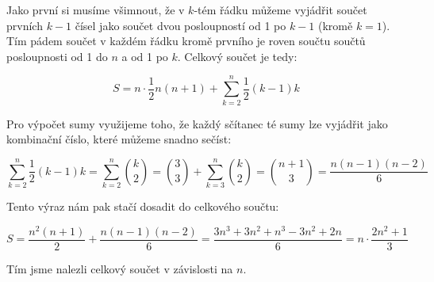 \documentclass{fkssolpub}
\author{Ondřej Sedláček}
\begin{document}
Jako první si musíme všimnout, že v $k$-tém řádku můžeme vyjádřit součet prvních $k - 1$ čísel jako součet dvou posloupností od 1 po $k - 1$ (kromě $k = 1$). Tím pádem součet v každém řádku kromě prvního je roven součtu součtů posloupnosti od 1 do $n$ a od 1 po $k$. Celkový součet je tedy:

\[
	S = n \cdot \frac{1}{2} n (n + 1) + \sum_{k = 2}^{n} \frac{1}{2} (k - 1) k
\]

Pro výpočet sumy využijeme toho, že každý sčítanec té sumy lze vyjádřit jako kombinační číslo, které můžeme snadno sečíst:

\[
	\sum_{k = 2}^{n} \frac{1}{2} (k - 1) k = \sum_{k = 2}^{n} \binom{k}{2} = \binom{3}{3} + \sum_{k = 3}^{n} \binom{k}{2} = \binom{n + 1}{3} = \frac{n (n - 1)(n - 2)}{6}
\]

Tento výraz nám pak stačí dosadit do celkového součtu:

\[
	S = \frac{n^2 (n + 1)}{2} + \frac{n (n - 1)(n - 2)}{6} = \frac{3n^3 + 3n^2 + n^3 -3n^2 + 2n}{6} = n \cdot \frac{2n^2 + 1}{3}
\]

Tím jsme nalezli celkový součet v závislosti na $n$.
\end{document}
